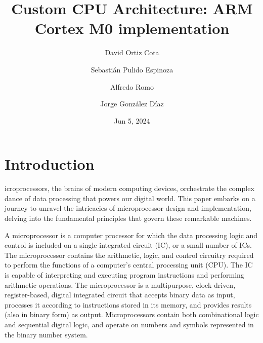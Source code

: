\documentclass[9pt,a4paper,twoside]{tau}
\title{Custom CPU Architecture: ARM Cortex M0 implementation}
\author[a]{David Ortiz Cota}
\author[a]{Sebastián Pulido Espinoza}
\author[a]{Alfredo Romo}
\author[a]{Jorge González Díaz}
\affil[a]{Student}
\date{Jun 5, 2024}
\begin{document}
	
    \maketitle
    \thispagestyle{firststyle}
    \abscontent
    \tableofcontents



\section{Introduction}

    icroprocessors, the brains of modern computing devices, orchestrate the complex dance of data processing that powers our digital world. This paper embarks on a journey to unravel the intricacies of microprocessor design and implementation, delving into the fundamental principles that govern these remarkable machines.

    A microprocessor is a computer processor for which the data processing logic and control is included on a single integrated circuit (IC), or a small number of ICs. The microprocessor contains the arithmetic, logic, and control circuitry required to perform the functions of a computer's central processing unit (CPU). The IC is capable of interpreting and executing program instructions and performing arithmetic operations. The microprocessor is a multipurpose, clock-driven, register-based, digital integrated circuit that accepts binary data as input, processes it according to instructions stored in its memory, and provides results (also in binary form) as output. Microprocessors contain both combinational logic and sequential digital logic, and operate on numbers and symbols represented in the binary number system.
\end{document}

